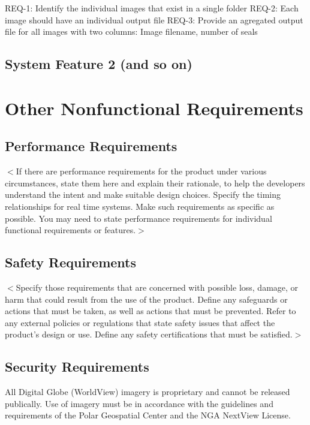 \documentclass{scrreprt}
\begin{document}
REQ-1: Identify the individual images that exist in a single folder
REQ-2: Each image should have an individual output file
REQ-3: Provide an agregated output file for all images with two columns: Image 
filename, number of seals

\section{System Feature 2 (and so on)}


\chapter{Other Nonfunctional Requirements}

\section{Performance Requirements}
$<$If there are performance requirements for the product under various 
circumstances, state them here and explain their rationale, to help the 
developers understand the intent and make suitable design choices. Specify the 
timing relationships for real time systems. Make such requirements as specific 
as possible. You may need to state performance requirements for individual 
functional requirements or features.$>$

\section{Safety Requirements}
$<$Specify those requirements that are concerned with possible loss, damage, or 
harm that could result from the use of the product. Define any safeguards or 
actions that must be taken, as well as actions that must be prevented. Refer to 
any external policies or regulations that state safety issues that affect the 
product’s design or use. Define any safety certifications that must be 
satisfied.$>$

\section{Security Requirements}

All Digital Globe (WorldView) imagery is proprietary and cannot be released publically. 
Use of imagery must be in accordance with the guidelines and requirements of the Polar 
Geospatial Center and the NGA NextView License. 
\end{document}

